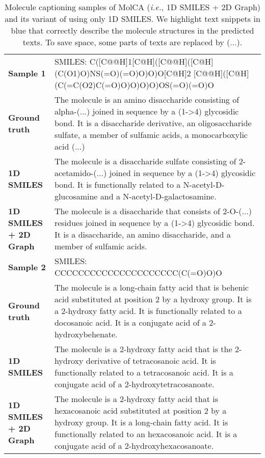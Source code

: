 \documentclass[11pt]{article}
\newcommand{\ie}{\emph{i.e., }}
\newcommand{\blue}[1]{\textcolor{bluehightlight}{#1}}
\begin{document}
\begin{table*}[t!]
\centering
\small
\begin{tabular}{lp{12cm}}\toprule
\textbf{Sample 1} & SMILES: C([C@@H]1[C@H]([C@@H]([C@H](C(O1)O)NS(=O)(=O)O)O)O[C@H]2 [C@@H]([C@H](C(=C(O2)C(=O)O)O)O)O)OS(=O)(=O)O\\\cmidrule(lr){2-2}
\textbf{Ground truth} & The molecule is an amino disaccharide consisting of alpha-(...) joined in sequence by a (1->4) glycosidic bond. It is a disaccharide derivative, an oligosaccharide sulfate, a member of sulfamic acids, a monocarboxylic acid (...) \\\cmidrule(lr){2-2}
\textbf{1D SMILES} & The molecule is a \blue{disaccharide} sulfate consisting of 2-acetamido-(...) \blue{joined in sequence by a (1->4) glycosidic bond}. It is functionally related to a N-acetyl-D-glucosamine and a N-acetyl-D-galactosamine. \\\cmidrule(lr){2-2}
\textbf{1D SMILES + 2D Graph} & The molecule is a \blue{disaccharide} that consists of 2-O-(...) residues \blue{joined in sequence by a (1->4) glycosidic bond}. It is a disaccharide, \blue{an amino disaccharide}, and \blue{a member of sulfamic acids}. \\
\midrule
\textbf{Sample 2} & SMILES: CCCCCCCCCCCCCCCCCCCCC(C(=O)O)O \\\cmidrule(lr){2-2}
\textbf{Ground truth} & The molecule is a long-chain fatty acid that is behenic acid substituted at position 2 by a hydroxy group. It is a 2-hydroxy fatty acid. It is functionally related to a docosanoic acid. It is a conjugate acid of a 2-hydroxybehenate. \\\cmidrule(lr){2-2}
\textbf{1D SMILES} & The molecule is a \blue{2-hydroxy fatty acid} that is the 2-hydroxy derivative of tetracosanoic acid. It is functionally related to a tetracosanoic acid. It is a \blue{conjugate acid} of a 2-hydroxytetracosanoate. \\\cmidrule(lr){2-2}
\textbf{1D SMILES + 2D Graph} & The molecule is a \blue{2-hydroxy fatty acid} that is hexacosanoic acid \blue{substituted at position 2 by a hydroxy group}. It is a \blue{long-chain fatty acid}. It is functionally related to an hexacosanoic acid. It is a \blue{conjugate acid} of a 2-hydroxyhexacosanoate. \\
\bottomrule
\end{tabular}
\caption{Molecule captioning samples of MolCA (\ie 1D SMILES + 2D Graph) and its variant of using only 1D SMILES. We highlight text snippets in \blue{blue} that correctly describe the molecule structures in the predicted texts. To save space, some parts of texts are replaced by (...).}
\label{tab:case}
\end{table*}
\end{document}
